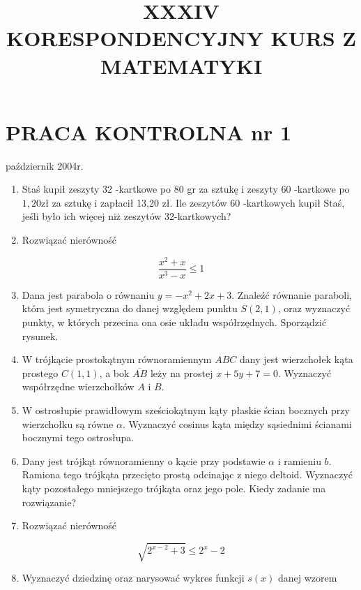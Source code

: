 \documentclass[10pt]{article}
\title{XXXIV \\
 KORESPONDENCYJNY KURS Z MATEMATYKI }
\author{}
\date{}
\begin{document}
\maketitle
\section*{PRACA KONTROLNA nr 1}
październik 2004r.

\begin{enumerate}
  \item Staś kupił zeszyty 32 -kartkowe po 80 gr za sztukę i zeszyty 60 -kartkowe po $1,20 \mathrm{zł}$ za sztukę i zapłacił 13,20 zł. Ile zeszytów 60 -kartkowych kupił Staś, jeśli było ich więcej niż zeszytów 32-kartkowych?
  \item Rozwiązać nierówność
\end{enumerate}

$$
\frac{x^{2}+x}{x^{3}-x} \leqslant 1
$$

\begin{enumerate}
  \setcounter{enumi}{2}
  \item Dana jest parabola o równaniu $y=-x^{2}+2 x+3$. Znaleźć równanie paraboli, która jest symetryczna do danej względem punktu $S(2,1)$, oraz wyznaczyć punkty, w których przecina ona osie układu współrzędnych. Sporządzić rysunek.
  \item W trójkącie prostokątnym równoramiennym $A B C$ dany jest wierzchołek kąta prostego $C(1,1)$, a bok $\overline{A B}$ leży na prostej $x+5 y+7=0$. Wyznaczyć współrzędne wierzchołków $A$ i $B$.
  \item W ostrosłupie prawidłowym sześciokątnym kąty płaskie ścian bocznych przy wierzchołku są równe $\alpha$. Wyznaczyć cosinus kąta między sąsiednimi ścianami bocznymi tego ostrosłupa.
  \item Dany jest trójkąt równoramienny o kącie przy podstawie $\alpha$ i ramieniu $b$. Ramiona tego trójkąta przecięto prostą odcinając z niego deltoid. Wyznaczyć kąty pozostałego mniejszego trójkąta oraz jego pole. Kiedy zadanie ma rozwiązanie?
  \item Rozwiązać nierówność
\end{enumerate}

$$
\sqrt{2^{x-2}+3} \leqslant 2^{x}-2
$$

\begin{enumerate}
  \setcounter{enumi}{7}
  \item Wyznaczyć dziedzinę oraz narysować wykres funkcji $s(x)$ danej wzorem
\end{enumerate}
\end{document}
